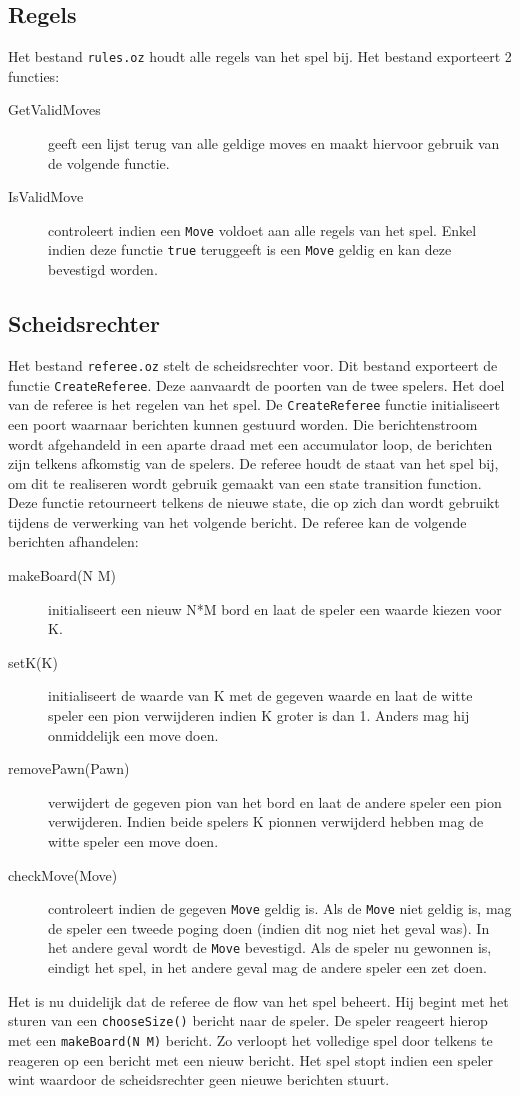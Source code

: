 \documentclass{article}
\begin{document}
\subsection{Regels}
Het bestand \texttt{rules.oz} houdt alle regels van het spel bij. Het bestand exporteert 2 functies: 
\begin{description}
	\item[GetValidMoves] geeft een lijst terug van alle geldige moves en maakt hiervoor gebruik van de volgende functie. 
	\item[IsValidMove] controleert indien een \texttt{Move} voldoet aan alle regels van het spel. Enkel indien deze functie \texttt{true} teruggeeft is een \texttt{Move} geldig en kan deze bevestigd worden. 
\end{description}
\subsection{Scheidsrechter}
	Het bestand \texttt{referee.oz} stelt de scheidsrechter voor. Dit bestand exporteert de functie \texttt{CreateReferee}. Deze aanvaardt de poorten van de twee spelers. Het doel van de referee is het regelen van het spel. De \texttt{CreateReferee} functie initialiseert een poort waarnaar berichten kunnen gestuurd worden. Die berichtenstroom wordt afgehandeld in een aparte draad met een accumulator loop, de berichten zijn telkens afkomstig van de spelers. De referee houdt de staat van het spel bij, om dit te realiseren wordt gebruik gemaakt van een state transition function. Deze functie retourneert telkens de nieuwe state, die op zich dan wordt gebruikt tijdens de verwerking van het volgende bericht.
	De referee kan de volgende berichten afhandelen: 
	\begin{description}
		\item[makeBoard(N M)] initialiseert een nieuw N*M bord en laat de speler een waarde kiezen voor K. 
		\item[setK(K)] initialiseert de waarde van K met de gegeven waarde en laat de witte speler een pion verwijderen indien K groter is dan 1. Anders mag hij onmiddelijk een move doen. 
		\item[removePawn(Pawn)] verwijdert de gegeven pion van het bord en laat de andere speler een pion verwijderen. Indien beide spelers K pionnen verwijderd hebben mag de witte speler een move doen. 
		\item[checkMove(Move)] controleert indien de gegeven \texttt{Move} geldig is. Als de \texttt{Move} niet geldig is, mag de speler een tweede poging doen (indien dit nog niet het geval was). In het andere geval wordt de \texttt{Move} bevestigd. Als de speler nu gewonnen is, eindigt het spel, in het andere geval mag de andere speler een zet doen. 
	\end{description} 
	Het is nu duidelijk dat de referee de flow van het spel beheert. Hij begint met het sturen van een \texttt{chooseSize()} bericht naar de speler. De speler reageert hierop met een \texttt{makeBoard(N M)} bericht. Zo verloopt het volledige spel door telkens te reageren op een bericht met een nieuw bericht. Het spel stopt indien een speler wint waardoor de scheidsrechter geen nieuwe berichten stuurt.
\end{document}
